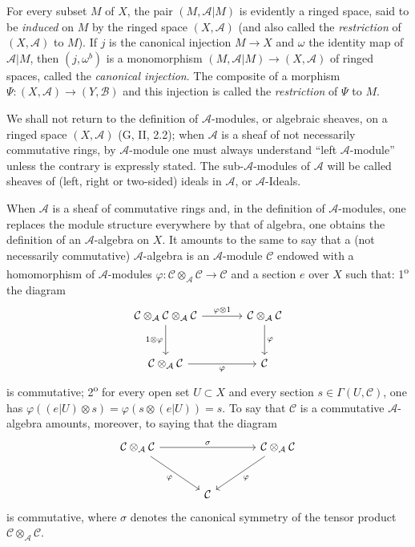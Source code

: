 \begin{env}[4.1.2]
\label{0.4.1.2}
For every subset $M$ of $X$, the pair $(M,\mathcal{A}|M)$ is evidently a
ringed space, said to be \emph{induced} on $M$ by the ringed space
$(X,\mathcal{A})$ (and also called the \emph{restriction} of
$(X,\mathcal{A})$ to $M$). If $j$ is the canonical injection $M\to X$ and
$\omega$ the identity map of $\mathcal{A}|M$, then $(j,\omega^b)$ is a
monomorphism $(M,\mathcal{A}|M)\to(X,\mathcal{A})$ of ringed spaces, called
the \emph{canonical injection}. The composite of a morphism
$\Psi:(X,\mathcal{A})\to(Y,\mathcal{B})$ and this injection is called the
\emph{restriction} of $\Psi$ to $M$.
\end{env}

\begin{env}[4.1.3]
\label{0.4.1.3}
We shall not return to the definition of $\mathcal{A}$-modules, or
algebraic sheaves, on a ringed space $(X,\mathcal{A})$
(G, II, 2.2); when $\mathcal{A}$ is a sheaf of not necessarily
commutative rings, by $\mathcal{A}$-module one must always
understand ``left $\mathcal{A}$-module'' unless the contrary is
expressly stated. The sub-$\mathcal{A}$-modules of $\mathcal{A}$ will be called
sheaves of (left, right or two-sided) ideals in $\mathcal{A}$, or
$\mathcal{A}$-Ideals.

When $\mathcal{A}$ is a sheaf of commutative rings and, in the
definition of $\mathcal{A}$-modules, one replaces the module structure
everywhere by that of algebra, one obtains the definition of an
$\mathcal{A}$-algebra on $X$. It amounts to the same to say that a
(not necessarily commutative) $\mathcal{A}$-algebra is an
$\mathcal{A}$-module $\mathcal{C}$ endowed with a homomorphism of
$\mathcal{A}$-modules
$\varphi:\mathcal{C}\otimes_{\mathcal{A}}\mathcal{C}\to\mathcal{C}$ and
a section $e$ over $X$ such that: 1\textsuperscript{o} the diagram
\[
\begin{tikzcd}[column sep=large,row sep=large]
\mathcal{C}\otimes_{\mathcal{A}}\mathcal{C}\otimes_{\mathcal{A}}\mathcal{C}
  \arrow[r,"\varphi\otimes 1"]
  \arrow[d,"1\otimes\varphi"']
&
\mathcal{C}\otimes_{\mathcal{A}}\mathcal{C}
  \arrow[d,"\varphi"]
\\
\mathcal{C}\otimes_{\mathcal{A}}\mathcal{C}
  \arrow[r,"\varphi"']
&
\mathcal{C}
\end{tikzcd}
\]
is commutative; 2\textsuperscript{o} for every open set $U\subset X$ and every section
$s\in\Gamma(U,\mathcal{C})$, one has
$\varphi((e|U)\otimes s)=\varphi(s\otimes(e|U))=s$. To say that
$\mathcal{C}$ is a commutative $\mathcal{A}$-algebra amounts, moreover, to
saying that the diagram
\[
\begin{tikzcd}[column sep=large,row sep=large]
\mathcal{C}\otimes_{\mathcal{A}}\mathcal{C}
  \arrow[rr,"\sigma"]
  \arrow[dr,"\varphi"']
&&
\mathcal{C}\otimes_{\mathcal{A}}\mathcal{C}
  \arrow[dl,"\varphi"]
\\
& \mathcal{C} &
\end{tikzcd}
\]
is commutative, where $\sigma$ denotes the canonical symmetry of the tensor product
$\mathcal{C}\otimes_{\mathcal{A}}\mathcal{C}$.


\end{env}
